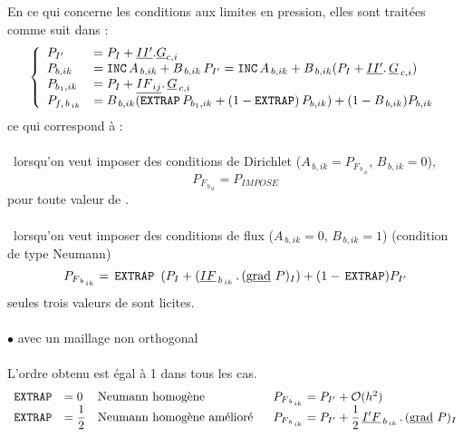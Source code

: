{En ce qui concerne les conditions aux limites en pression, elles sont
trait\'ees comme suit dans \CS :
\begin{equation}\notag
\left\{\begin{array}{llll}
P_{I'}&=P_{I}+\underline{II'}.\underline{G}_{c,i}\\
P_{b,ik}& =\text{\texttt{INC}}\,A_{\,b,ik} + B_{\,b,ik}\,P_{I'} = \text{\texttt{INC}}\,A_{\,b,ik} + B_{\,b,ik}(P_{I}+\underline{II'}.\,\underline{G}_{\,c,i}) \\
P_{b_{1},ik}&= P_{I}+\underline{I{F_{\,ij}}}.\,\underline{G}_{\,c,i}\\
P_{f,\,b_{\,ik}}&= B_{\,b,ik}(\text{\texttt{EXTRAP}}\,P_{b_{1},ik} + (1 -\text{\texttt{EXTRAP}})\,P_{b,ik}) + (1 -
B_{\,b,ik})P_{b,ik}
\end{array}\right.
\end{equation}
ce qui correspond \`a :\\\\
\hspace*{1cm}{\tiny$\blacksquare$}\, lorsqu'on veut imposer des conditions de Dirichlet ($A_{\,b,ik} =
P_{F_{\,b_{\,ik}}}$, $B_{\,b,ik} = 0$),
\begin{equation}
P_{F_{\,b_{\,ik}}}  = P_{IMPOSE}
\end{equation}
pour toute valeur de .\\\\
\hspace*{1cm}{\tiny$\blacksquare$}\, lorsqu'on veut imposer des conditions de
flux ($A_{\,b,ik} = 0$, $B_{\,b,ik} = 1$) (condition de type Neumann)
\begin{equation}
P_{F_{\,b_{\,ik}}}  = \,\text{\texttt{EXTRAP}}\,\ (P_{I} + (\underline{IF}_{\,b_{\,ik}}\,.\,(\text{g}\underline{\text{rad}}\  P)_{I})  + (1 -\,\text{\texttt{EXTRAP}}) P_{I'}
\end{equation}
seules trois valeurs de  sont licites.\\\\
\hspace*{2cm}$\bullet $ avec un maillage non orthogonal \\\\
L'ordre obtenu est \'egal \`a 1 dans tous les cas.
\begin{equation}\notag
\begin{array}{llll}
\var{EXTRAP}&= 0 &\text{Neumann homog\`ene}&\ \  P_{F_{\,b_{\,ik}}} = P_{I'} + \mathcal{O}(h^2)\\
\var{EXTRAP}&= \displaystyle\frac{1}{2} &\text{Neumann homog\`ene am\'elior\'e}&\ \
P_{F_{\,b_{\,ik}}} = P_{I'} + \displaystyle\frac{1}{2}\,\vect{I'F}_{\,b_{\,ik}}\,.\,(\grad P)_{I}

\end{array}
\end{equation}}
